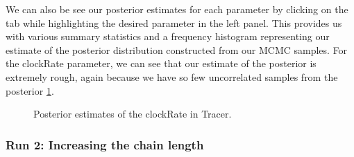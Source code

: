 \documentclass[11pt]{article}
\begin{document}
We can also be see our posterior estimates for each parameter by clicking on the  tab while highlighting the desired parameter in the left panel. This provides us with various summary statistics and a frequency histogram representing our estimate of the posterior distribution constructed from our MCMC samples. For the clockRate parameter, we can see that our estimate of the posterior is extremely rough, again because we have so few uncorrelated samples from the posterior \ref{fig:tracer_run1_ests}.

\begin{figure}[!h]
\centering
{}
\caption{\small Posterior estimates of the clockRate in Tracer.}
\label{fig:tracer_run1_ests}
\end{figure}

\bigskip
\subsubsection{Run 2: Increasing the chain length}
\end{document}

